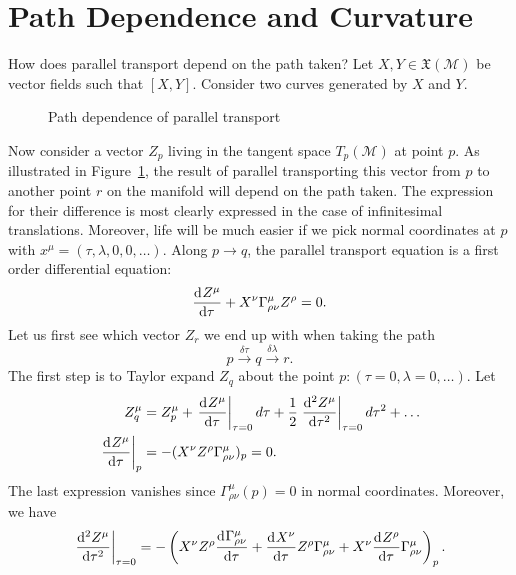\section{Path Dependence and Curvature}%
\label{sec:path_dependence_and_curvature}

How does parallel transport depend on the path taken?
Let $X, Y \in \mathfrak{X}(\mathcal{M})$ be vector fields such that $[X, Y]$. Consider two curves generated by $X$ and $Y$.
\begin{figure}[tbph]
  \centering
  \def\svgwidth{0.5\columnwidth}
  
  \caption{Path dependence of parallel transport}
  \label{fig:l11f1}
\end{figure}
Now consider a vector $Z_p$ living in the tangent space $T_p(\mathcal{M})$ at point $p$.
As illustrated in Figure~\ref{fig:l11f1}, the result of parallel transporting this vector from $p$ to another point $r$ on the manifold will depend on the path taken.
The expression for their difference is most clearly expressed in the case of infinitesimal translations.
Moreover, life will be much easier if we pick normal coordinates at $p$ with $x^{\mu} = (\tau, \lambda, 0, 0, \dots)$.
Along $p \to q$, the parallel transport equation is a first order differential equation:
\begin{equation}
  \dv[]{Z^{\mu}}{\tau} + X^{\nu} \Gamma^{\mu}_{\rho\nu} Z^{\rho} = 0.
\end{equation}
Let us first see which vector $Z_r$ we end up with when taking the path
\begin{equation}
  p \xrightarrow{\delta \tau} q \xrightarrow{\delta\lambda} r.
\end{equation}
The first step is to Taylor expand $Z_q$ about the point $p: (\tau = 0, \lambda = 0, \dots)$. Let
\begin{align}
  Z^{\mu}_q &= Z^{\mu}_p + \left.\dv[]{Z^{\mu}}{\tau}\right\rvert_{\tau = 0} d\tau 
  + \frac{1}{2} \left.\dv[2]{Z^{\mu}}{\tau}\right\rvert_{\tau = 0} d\tau^2 + \dots \\
  \left.\dv[]{Z^{\mu}}{\tau}\right\rvert_p &= - (X^{\nu} Z^{\rho} \Gamma^{\mu}_{\rho\nu})_p = 0.
\end{align}
The last expression vanishes since $\Gamma^{\mu}_{\rho\nu}(p) = 0$ in normal coordinates.
Moreover, we have
\begin{equation}
  \left.\dv[2]{Z^{\mu}}{\tau}\right\rvert_{\tau = 0} = - \left( X^{\nu}Z^{\rho} \dv[]{\Gamma^{\mu}_{\rho\nu}}{\tau} + \dv[]{X^{\nu}}{\tau} Z^{\rho} \Gamma^{\mu}_{\rho\nu} + X^{\nu} \dv[]{Z^{\rho}}{\tau} \Gamma^{\mu}_{\rho\nu} \right)_p.
\end{equation}
